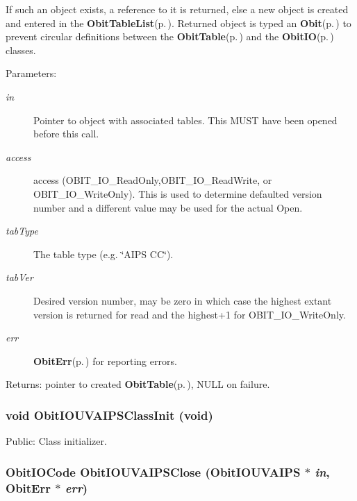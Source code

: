If such an object exists, a reference to it is returned, else a new object is created and entered in the {\bf Obit\-Table\-List}{\rm (p.\,\pageref{structObitTableList})}. Returned object is typed an {\bf Obit}{\rm (p.\,\pageref{structObit})} to prevent circular definitions between the {\bf Obit\-Table}{\rm (p.\,\pageref{structObitTable})} and the {\bf Obit\-IO}{\rm (p.\,\pageref{structObitIO})} classes. \begin{Desc}
\item[Parameters:]
\begin{description}
\item[{\em in}]Pointer to object with associated tables. This MUST have been opened before this call. \item[{\em access}]access (OBIT\_\-IO\_\-Read\-Only,OBIT\_\-IO\_\-Read\-Write, or OBIT\_\-IO\_\-Write\-Only). This is used to determine defaulted version number and a different value may be used for the actual Open. \item[{\em tab\-Type}]The table type (e.g. \char`\"{}AIPS CC\char`\"{}). \item[{\em tab\-Ver}]Desired version number, may be zero in which case the highest extant version is returned for read and the highest+1 for OBIT\_\-IO\_\-Write\-Only. \item[{\em err}]{\bf Obit\-Err}{\rm (p.\,\pageref{structObitErr})} for reporting errors. \end{description}
\end{Desc}
\begin{Desc}
\item[Returns:]pointer to created {\bf Obit\-Table}{\rm (p.\,\pageref{structObitTable})}, NULL on failure. \end{Desc}
\subsubsection{\setlength{\rightskip}{0pt plus 5cm}void Obit\-IOUVAIPSClass\-Init (void)}\label{ObitIOUVAIPS_8h_a3}


Public: Class initializer. 

\subsubsection{\setlength{\rightskip}{0pt plus 5cm}Obit\-IOCode Obit\-IOUVAIPSClose ({\bf Obit\-IOUVAIPS} $\ast$ {\em in}, {\bf Obit\-Err} $\ast$ {\em err})}\label{ObitIOUVAIPS_8h_a11}



